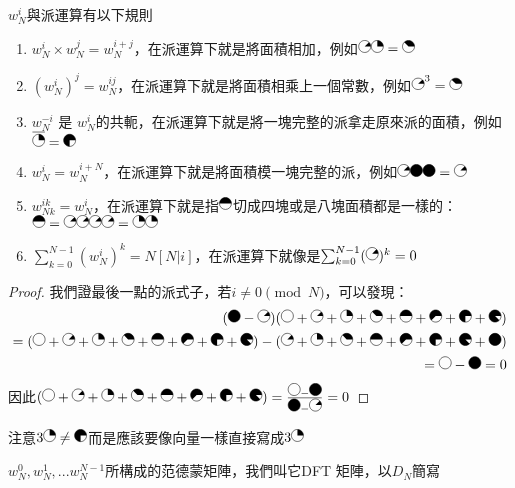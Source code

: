 \begin{theorem}
$w_N^i$與派運算有以下規則\\
\begin{enumerate}
\item $w^i_N\times w^j_N=w^{i+j}_N$，在派運算下就是將面積相加，例如$\pie{45} \pie{90} = \pie{135}$
\item $(w^i_N)^j=w^{ij}_N$，在派運算下就是將面積相乘上一個常數，例如$\pie{45}^3=\pie{135}$
\item $w^{-i}_N$ 是 $w^i_N$的共軛，在派運算下就是將一塊完整的派拿走原來派的面積，例如$\overline{\pie{90}}=\pie{270}$
\item $w^i_N=w^{i+N}_N$，在派運算下就是將面積模一塊完整的派，例如$\pie{45}\pie{360}\pie{360}=\pie{45}$
\item $w^{ik}_{Nk}=w^{i}_N$，在派運算下就是指$\pie{180}$切成四塊或是八塊面積都是一樣的：$\pie{180}=\pie{45}\pie{45}\pie{45}\pie{45}=\pie{90}\pie{90}$
\item $\sum_{k=0}^{N-1}(w^i_N)^k=N[N|i]$，在派運算下就像是$\sum_{k=0}^{N-1}(\pie{45})^k=0$
\end{enumerate}
\end{theorem}
\begin{proof}
我們證最後一點的派式子，若$i\neq 0\pmod N$，可以發現：
\begin{equation}
  \begin{aligned}
(\pie{360}-\pie{45})(\pie{0}+\pie{45}+\pie{90}+\pie{135}+\pie{180}+\pie{225}+\pie{270}+\pie{315})\\
=(\pie{0}+\pie{45}+\pie{90}+\pie{135}+\pie{180}+\pie{225}+\pie{270}+\pie{315})-(\pie{45}+\pie{90}+\pie{135}+\pie{180}+\pie{225}+\pie{270}+\pie{315}+\pie{360})\\
=\pie{0}-\pie{360} = 0
  \end{aligned}\nonumber
\end{equation}
因此$(\pie{0}+\pie{45}+\pie{90}+\pie{135}+\pie{180}+\pie{225}+\pie{270}+\pie{315})=\frac{\pie{0}-\pie{360}}{\pie{360}-\pie{45}}=0$
\end{proof}

注意$3\pie{90}\neq \pie{270}$而是應該要像向量一樣直接寫成$3\pie{90}$

\begin{definition}
$w^0_N,w^1_N,...w^{N-1}_N$所構成的范德蒙矩陣，我們叫它DFT 矩陣，以$D_N$簡寫
\end{definition}



